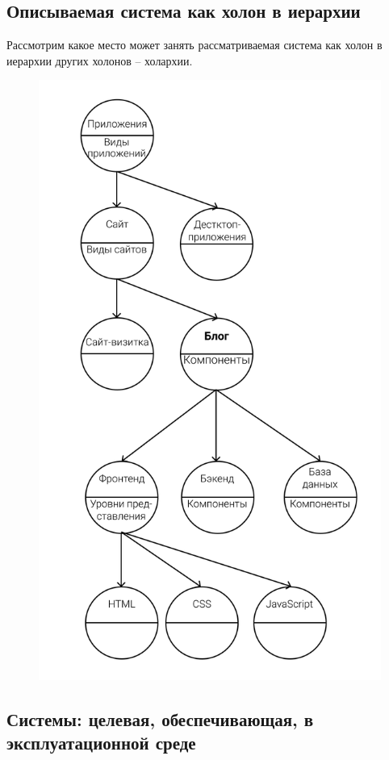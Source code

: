 \documentclass[bibliography=totocnumbered]{scrartcl}
\begin{document}
\subsection{Описываемая система как холон в иерархии}
Рассмотрим какое место может занять рассматриваемая система как холон в иерархии других холонов -- холархии.
\begin{figure}[!htp]
    \centering \includegraphics[scale=1]{hol_it.jpg}
\end{figure}
\subsection{Системы: целевая, обеспечивающая, в эксплуатационной среде}
\end{document}
